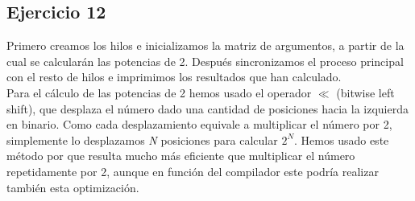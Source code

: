 \documentclass[]{article}
\begin{document}
\subsection*{Ejercicio 12}
Primero creamos los hilos e inicializamos la matriz de argumentos, a partir de la cual se calcularán las potencias de 2. Después sincronizamos el proceso principal con el resto de hilos e imprimimos los resultados que han calculado. \\
Para el cálculo de las potencias de 2 hemos usado el operador $\ll$ (bitwise left shift), que desplaza el número dado una cantidad de posiciones hacia la izquierda en binario. Como cada desplazamiento equivale a multiplicar el número por 2, simplemente lo desplazamos \textit{N} posiciones para calcular \textit{$2^N$}. Hemos usado este método por que resulta mucho más eficiente que multiplicar el número repetidamente por 2, aunque en función del compilador este podría realizar también esta optimización.
\end{document}
